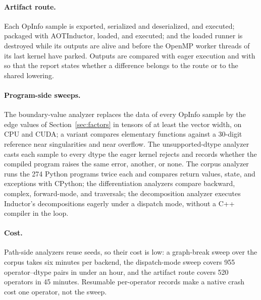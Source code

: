 \paragraph{Artifact route.} Each OpInfo sample is exported, serialized and deserialized, and executed; packaged
with AOTInductor, loaded, and executed; and the loaded runner is destroyed while its outputs are alive and
before the OpenMP worker threads of its last kernel have parked. Outputs are compared with eager execution and
with \tcompile so that the report states whether a difference belongs to the route or to the shared lowering.

\paragraph{Program-side sweeps.} The boundary-value analyzer replaces the data of every OpInfo sample by the
edge values of Section~\ref{sec:factors} in tensors of at least the vector width, on CPU and CUDA; a variant
compares elementary functions against a 30-digit reference near singularities and near overflow. The
unsupported-dtype analyzer casts each sample to every dtype the eager kernel rejects and records whether the
compiled program raises the same error, another, or none. The corpus analyzer runs the 274 Python programs twice
each and compares return values, state, and exceptions with CPython; the differentiation analyzers compare
backward, complex, forward-mode, and  traversals; the decomposition analyzer executes Inductor's
decompositions eagerly under a dispatch mode, without a C++ compiler in the loop.

\paragraph{Cost.} Path-side analyzers reuse seeds, so their cost is low: a graph-break sweep over the corpus takes
six minutes per backend, the dispatch-mode sweep covers 955 operator--dtype pairs in under an hour, and the artifact
route covers 520 operators in 45 minutes. Resumable per-operator records make a native crash cost one operator,
not the sweep.
